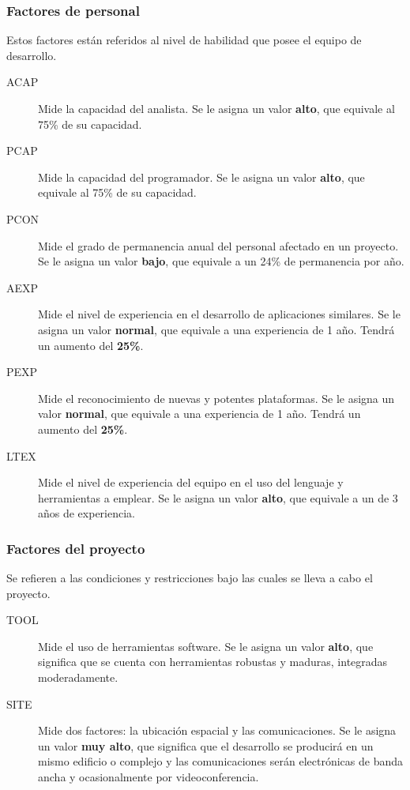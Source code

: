 \documentclass[11pt,a4paper,spanish,twoside]{report}
\begin{document}
\subsubsection{Factores de personal}
Estos factores están referidos al nivel de habilidad que posee el equipo de
desarrollo.
\begin{description}
\item[ACAP] Mide la capacidad del analista. Se le asigna un valor
\textbf{alto}, que equivale al 75\% de su capacidad.
\item[PCAP] Mide la capacidad del programador. Se le asigna un valor
\textbf{alto}, que equivale al 75\% de su capacidad.
\item[PCON] Mide el grado de permanencia anual del personal afectado en un
proyecto. Se le asigna un valor \textbf{bajo}, que equivale a un 24\% de
permanencia por año.
\item[AEXP] Mide el nivel de experiencia en el desarrollo de aplicaciones
similares. Se le asigna un valor \textbf{normal}, que equivale a una
experiencia de 1 año. Tendrá un aumento del \textbf{25\%}.
\item[PEXP] Mide el reconocimiento de nuevas y potentes plataformas. Se le
asigna un valor \textbf{normal}, que equivale a una experiencia de 1
año. Tendrá un aumento del \textbf{25\%}. 
\item[LTEX] Mide el nivel de experiencia del equipo en el uso del lenguaje y
herramientas a emplear. Se le asigna un valor \textbf{alto}, que
equivale a un de 3 años de experiencia.
\end{description}

\subsubsection{Factores del proyecto}
Se refieren a las condiciones y restricciones bajo las cuales se lleva a cabo
el proyecto.
\begin{description}
\item[TOOL] Mide el uso de herramientas software. Se le asigna un valor
\textbf{alto}, que significa que se cuenta con herramientas robustas y
maduras, integradas moderadamente.
\item[SITE] Mide dos factores: la ubicación espacial y las comunicaciones.
Se le asigna un valor \textbf{muy alto}, que significa que el desarrollo
se producirá en un mismo edificio o complejo y las comunicaciones serán
electrónicas de banda ancha y ocasionalmente por videoconferencia.
\end{description}
\end{document}

